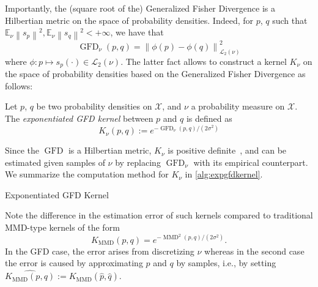 \documentclass{uai2023} %
\begin{document}
Importantly, the (square root of
the) Generalized Fisher Divergence is a Hilbertian metric on the space
of probability densities.
Indeed, for $ p $, $ q $ such that $ \mathbb{E}_{ \nu } \left \| s_p  \right
\|^2, \mathbb{E}_{ \nu } \left \| s_q  \right \|^2 < +\infty $, we have that
\begin{equation*}
\operatorname{GFD}_{\nu}(p, q) = \left \| \phi(p) - \phi(q) \right \|_{\mathcal  L_2(\nu)}^{2}
\end{equation*}
where $ \phi \colon p  \mapsto s_p(\cdot) \in \mathcal L_2(\nu)  $.
The latter fact allows to construct a kernel $ K_{\nu} $ on the space of
probability densities based on the Generalized Fisher Divergence as follows:
\begin{definition}\label{def:expgfdkernel}
    Let $ p $,  $ q $ be two probability densities on $ \mathcal  X $, and
    $ \nu $ a probability measure on $ \mathcal  X $. The \emph{exponentiated
    GFD kernel} between $ p $ and $ q $ is defined as
\begin{equation*}
    K_{\nu}(p, q) := e^{ - \operatorname{GFD}_{\nu}(p, q)/ (2\sigma^2)}
\end{equation*}
\end{definition}
Since the $\operatorname{GFD} $ is a Hilbertian metric, $ K_{\nu} $ is positive
definite~\citep{DBLP:conf/icml/MeunierPC22}, and can be estimated given samples
of $ \nu $ by replacing $ \operatorname{GFD}_{\nu} $ with its empirical counterpart. We
summarize the computation method for $ K_{\nu} $ in \cref{alg:expgfdkernel}.

\begin{algorithm}
    \DontPrintSemicolon
    \caption{Exponentiated GFD Kernel}\label{alg:expgfdkernel}
    \BlankLine
    \;
\end{algorithm}

Note the difference in the estimation error of such kernels compared to
traditional MMD-type kernels of the form
\begin{equation*}
K_{\operatorname{MMD}}(p, q) = e^{ - \operatorname{MMD}^2(p, q)/ (2\sigma^2)}.
\end{equation*}
In the GFD case, the error arises from discretizing $\nu$ whereas in the second
case the error is caused by approximating $p$ and $q$ by samples, i.e., by setting $\widehat{K_{\operatorname{MMD}}(p, q) } := K_{\operatorname{MMD}}( \widehat{ p }, \widehat{ q }) $.
\end{document}
